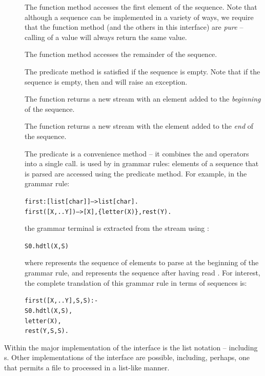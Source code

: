 \begin{description}
\item[]
The  function method accesses the first element of the sequence. Note that although a  sequence can be implemented in a variety of ways, we require that the function method  (and the others in this interface) are \emph{pure} -- calling  of a  value will always return the same value.
\item[]
The  function method accesses the remainder of the sequence.
\item[]
The  predicate method is satisfied if the sequence is empty. Note that if the sequence is empty, then  and  will raise an exception.
\item[]
The  function returns a new stream with an element added to the \emph{beginning} of the sequence.
\item[]
The  function returns a new stream with the element added to the \emph{end} of the sequence.
\item[]
The  predicate is a convenience method -- it combines the  and  operators into a single call.  is used by \go in grammar rules: elements of a sequence that is parsed are accessed using the  predicate method. For example, in the grammar rule:
\begin{alltt}
first:[list[char]]-->list[char].
first([X,..Y]) --> [X],\{letter(X)\},rest(Y).
\end{alltt}
the grammar terminal \q{[X]} is extracted from the stream using :
\begin{alltt}
S\sub0.hdtl(X,S)
\end{alltt}
where  represents the sequence of elements to parse at the beginning of the grammar rule, and  represents the sequence after having read . For interest, the complete translation of this grammar rule in terms of sequences is:
\begin{alltt}
first([X,..Y],S,S) :-
  S\sub0.hdtl(X,S),
  letter(X),
  rest(Y,S,S).
\end{alltt}
\end{description}

Within \go the major implementation of the  interface is the list notation -- including s. Other implementations of the  interface are possible, including, perhaps, one that permits a file to processed in a list-like manner.

